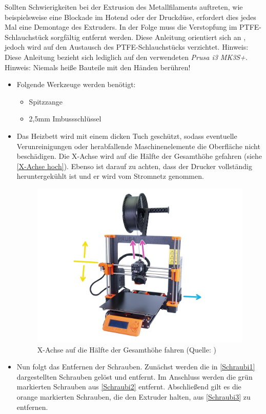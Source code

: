 Sollten Schwierigkeiten bei der Extrusion des Metallfilaments auftreten, wie beispielsweise eine Blockade im Hotend oder der Druckdüse, erfordert dies jedes Mal eine Demontage des Extruders. In der Folge muss die Verstopfung im PTFE-Schlauchstück sorgfältig entfernt werden. Diese Anleitung orientiert sich an \Autocite{Prusa}, jedoch wird auf den Austausch des PTFE-Schlauchstücks verzichtet.
Hinweis: Diese Anleitung bezieht sich lediglich auf den verwendeten \textit{Prusa i3 MK3S+}.\\
Hinweis: Niemals heiße Bauteile mit den Händen berühren!
\begin{itemize}
  \item Folgende Werkzeuge werden benötigt:
    \begin{itemize}
      \item Spitzzange
      \item 2,5mm Imbussschlüssel
    \end{itemize}
    \item Das Heizbett wird mit einem dicken Tuch geschützt, sodass eventuelle Verunreinigungen oder herabfallende Maschinenelemente die Oberfläche nicht beschädigen. Die X-Achse wird auf die Hälfte der Gesamthöhe gefahren (siehe \autoref{X-Achse hoch}). Ebenso ist darauf zu achten, dass der Drucker vollständig heruntergekühlt ist und er wird vom Stromnetz genommen.
      \begin{figure}[h]
        \centering
        \includegraphics[width=0.5\linewidth]{bilder/Anleitung - X-Achse hoch.jpg}
              \caption[Anleitung: X-Achse auf die Hälfte der Gesamthöhe fahren] { X-Achse auf die Hälfte der Gesamthöhe fahren (Quelle: \autocite{Prusa})}
        \label{X-Achse hoch}
      \end{figure}
      \FloatBarrier
    \item Nun folgt das Entfernen der Schrauben. Zunächst werden die in \autoref{Schraubi1} dargestellten Schrauben gelöst und entfernt. Im Anschluss werden die grün markierten Schrauben aus \autoref{Schraubi2} entfernt. Abschließend gilt es die orange markierten Schrauben, die den Extruder halten, aus \autoref{Schraubi3} zu entfernen.

\end{itemize}

